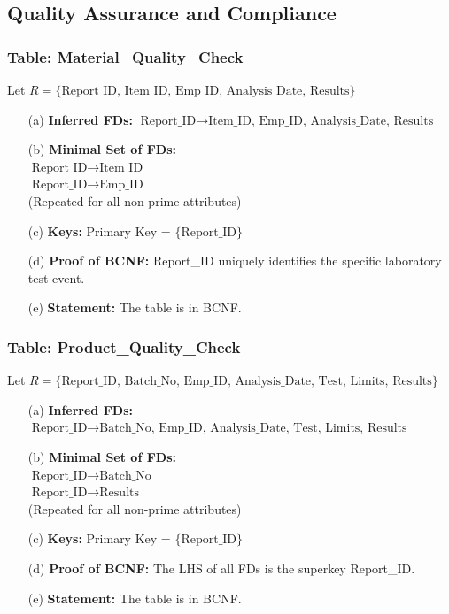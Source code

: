 \documentclass[12pt, a4paper]{article}
\begin{document}
\subsection{Quality Assurance and Compliance}

\subsubsection{Table: Material\_Quality\_Check}
Let $R = \{ \text{Report\_ID, Item\_ID, Emp\_ID, Analysis\_Date, Results} \}$
\begin{enumerate}
    \item[(a)] \textbf{Inferred FDs:} $\text{Report\_ID} \rightarrow \text{Item\_ID, Emp\_ID, Analysis\_Date, Results}$
    \item[(b)] \textbf{Minimal Set of FDs:} 
    \\ $\text{Report\_ID} \rightarrow \text{Item\_ID}$
    \\ $\text{Report\_ID} \rightarrow \text{Emp\_ID}$
    \\ (Repeated for all non-prime attributes)
    \item[(c)] \textbf{Keys:} Primary Key = $\{ \text{Report\_ID} \}$
    \item[(d)] \textbf{Proof of BCNF:} Report\_ID uniquely identifies the specific laboratory test event.
    \item[(e)] \textbf{Statement:} The table is in BCNF.
\end{enumerate}

\subsubsection{Table: Product\_Quality\_Check}
Let $R = \{ \text{Report\_ID, Batch\_No, Emp\_ID, Analysis\_Date, Test, Limits, Results} \}$
\begin{enumerate}
    \item[(a)] \textbf{Inferred FDs:} $\text{Report\_ID} \rightarrow \text{Batch\_No, Emp\_ID, Analysis\_Date, Test, Limits, Results}$
    \item[(b)] \textbf{Minimal Set of FDs:} 
    \\ $\text{Report\_ID} \rightarrow \text{Batch\_No}$
    \\ $\text{Report\_ID} \rightarrow \text{Results}$
    \\ (Repeated for all non-prime attributes)
    \item[(c)] \textbf{Keys:} Primary Key = $\{ \text{Report\_ID} \}$
    \item[(d)] \textbf{Proof of BCNF:} The LHS of all FDs is the superkey Report\_ID.
    \item[(e)] \textbf{Statement:} The table is in BCNF.
\end{enumerate}
\end{document}
